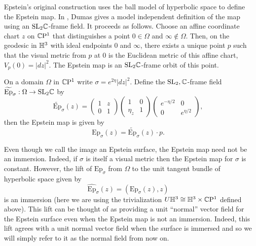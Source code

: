 Epstein's original construction uses the ball model of hyperbolic space to define the Epstein map. 
In \cite{dumas2017}, Dumas gives a model independent definition of the map using an $\text{SL}_2\mathbb{C}$-frame field. 
It proceeds as follows. 
Choose an affine coordinate chart $z$ on $\mathbb{C}\mathrm{P}^1$ that distinguishes a point $0 \in \Omega$ and $\infty \notin \Omega$. 
Then, on the geodesic in $\mathbb{H}^3$ with ideal endpoints $0$ and $\infty$, there exists a unique point $p$ such that the visual metric from $p$ at $0$ is the Euclidean metric of this affine chart, $V_p(0) = |dz|^2$. 
The Epstein map is an $\mathrm{SL}_2\mathbb{C}$-frame orbit of this point.     


\begin{prop}
On a domain $\Omega$ in $\mathbb{C}\mathrm{P}^1$ write $\sigma = e^{2\eta}|dz|^2$. Define the $\mathrm{SL}_2,\mathbb{C}$-frame field $\widetilde{\mathrm{Ep}}_\sigma: \Omega \to \mathrm{SL}_2\mathbb{C}$ by 
\[
\widetilde{\mathrm{Ep}}_\sigma(z) =
\begin{pmatrix}
1 & z \\
0 & 1
\end{pmatrix}
\begin{pmatrix}
1 & 0 \\
\eta_z & 1
\end{pmatrix}
\begin{pmatrix}
e^{-\eta/2} & 0 \\
0 & e^{\eta/2}
\end{pmatrix},
\]
then the Epstein map is given by 
\[
\mathrm{Ep}_\sigma(z) = \widetilde{\mathrm{Ep}}_\sigma(z) \cdot p.
\]
\end{prop}

 

Even though we call the image an Epstein surface, the Epstein map need not be an immersion. 
Indeed, if $\sigma$ is itself a visual metric then the Epstein map for $\sigma$ is constant. 
However, the lift of $\mathrm{Ep}_\sigma$ from $\Omega$ to the unit tangent bundle of hyperbolic space given by 
\[
\widehat{\mathrm{Ep}}_\sigma(z) = (\text{Ep}_\sigma(z),z) 
\] 
is an immersion (here we are using the trivialization $U\mathbb{H}^3 \cong \mathbb{H}^3 \times \mathbb{C}\mathrm{P}^1$ defined above). 
This lift can be thought of as providing a unit ``normal'' vector field for the Epstein surface even when the Epstein map is not an immersion. 
Indeed, this lift agrees with a unit normal vector field when the surface is immersed and so we will simply refer to it as the normal field from now on. 

